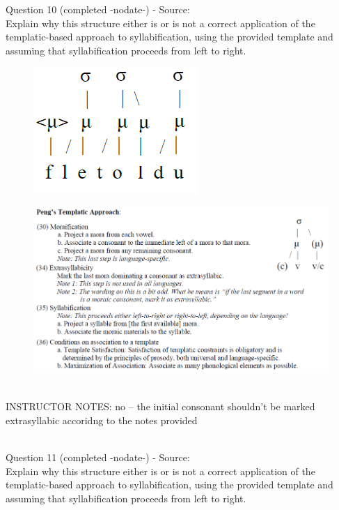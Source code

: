\documentclass[12pt]{article}
\begin{document}
{\large Question 10} (completed -nodate-) - Source: \\

Explain why this structure either is or is not a correct application of the templatic-based approach to syllabification, using the provided template and assuming that syllabification proceeds from left to right.\\

\begin{figure}[H]
\includegraphics{../images/pengtemplate_fletoldu_no.png}
\end{figure}
\begin{figure}[H]
\includegraphics{../images/peng_template_withdiagram.png}
\end{figure}

~\\
INSTRUCTOR NOTES: no -- the initial consonant shouldn't be marked extrasyllabic accoridng to the notes provided


~\\

{\large Question 11} (completed -nodate-) - Source: \\

Explain why this structure either is or is not a correct application of the templatic-based approach to syllabification, using the provided template and assuming that syllabification proceeds from left to right.\\
\end{document}
